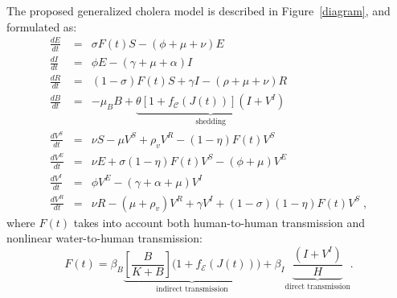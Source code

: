 The proposed generalized cholera model is described in Figure~\ref{diagram}, and formulated as:
\begingroup
\allowdisplaybreaks
\begin{eqnarray} \label{eq:fullmodel}
 \frac{dE}{dt} &=& \sigma F(t) S - (\phi + \mu +\nu) E \label{eq:E2}\\
 \frac{dI}{dt} &=& \phi E - (\gamma + \mu + \alpha) I \label{eq:I2}\\
 \frac{dR}{dt} &=& (1-\sigma) F(t) S + \gamma I - (\rho + \mu+\nu) R \label{eq:R2}\\
 \frac{dB}{dt} &=& - \mu_B B +\underbrace{\theta\left[1 + f_{\mathcal{C}}\left(J(t)\right) \right] (I+V^I)}_{\text{shedding}} \label{eq:B2}\\
\frac{dV^S}{dt} &=& \nu S - \mu V^S+ \rho_{v} V^R - (1-\eta) F(t) V^S \label{eq:VS2}\\
 \frac{dV^E}{dt} &=& \nu E + \sigma (1-\eta) F(t) V^S-(\phi + \mu) V^E \label{eq:VE2}\\
 \frac{dV^I}{dt} &=&  \phi V^E -(\gamma + \alpha + \mu) V^I \label{eq:VI2}\\
 \frac{dV^R}{dt} &=& \nu R -(\mu +\rho_{v})V^R +\gamma V^I +(1-\sigma) (1-\eta) F(t) V^S\label{eq:VR2}\; ,
\end{eqnarray}
\endgroup
where $F(t)$ takes into account both human-to-human transmission and nonlinear water-to-human transmission:
\begin{equation}
  F(t) = \beta_B \underbrace{ \left[\frac{B}{K + B} \right] \bigg(1+f_{\mathcal{E}}\left(J(t)\right)\bigg)}_{\text{indirect transmission}} + \beta_{I} \underbrace{\frac{(I+V^I)}{H}}_{\text{direct transmission}}.
\label{eq:force2}
\end{equation}

